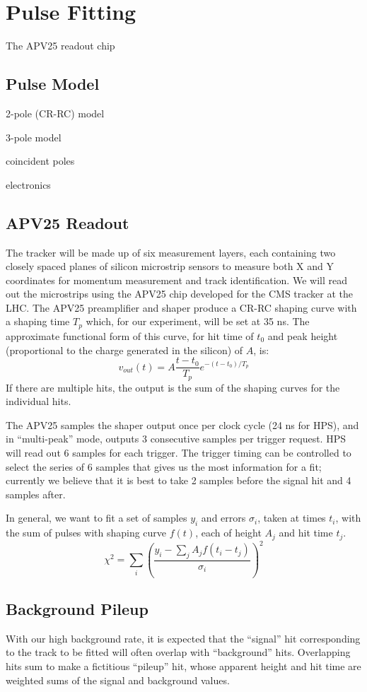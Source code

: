 \chapter{Pulse Fitting}
The APV25 readout chip

\section{Pulse Model}
2-pole (CR-RC) model

3-pole model

coincident poles

electronics

\section{APV25 Readout}
The tracker will be made up of six measurement layers, each containing two closely spaced planes of silicon microstrip sensors to measure both X and Y coordinates for momentum measurement and track identification. 
We will read out the microstrips using the APV25 chip developed for the CMS tracker at the LHC. 
The APV25 preamplifier and shaper produce a CR-RC shaping curve with a shaping time $T_p$ which, for our experiment, will be set at 35 ns. 
The approximate functional form of this curve, for hit time of $t_0$ and peak height (proportional to the charge generated in the silicon) of $A$, is:
$$v_{out}(t)=A\frac{t-t_0}{T_p}e^{-(t-t_0)/T_p}$$
If there are multiple hits, the output is the sum of the shaping curves for the individual hits.

The APV25 samples the shaper output once per clock cycle (24 ns for HPS), and in ``multi-peak'' mode, outputs 3 consecutive samples per trigger request. HPS will read out 6 samples for each trigger. The trigger timing can be controlled to select the series of 6 samples that gives us the most information for a fit; currently we believe that it is best to take 2 samples before the signal hit and 4 samples after.

In general, we want to fit a set of samples $y_i$ and errors $\sigma_i$, taken at times $t_i$, with the sum of pulses with shaping curve $f(t)$, each of height $A_j$ and hit time $t_j$.
$$\chi^2 = \sum_i\left(\frac{y_i-\sum_j A_j f(t_i-t_j)}{\sigma_i}\right)^2$$

\section{Background Pileup}
With our high background rate, it is expected that the ``signal'' hit corresponding to the track to be fitted will often overlap with ``background'' hits. 
Overlapping hits sum to make a fictitious ``pileup'' hit, whose apparent height and hit time are weighted sums of the signal and background values. 

